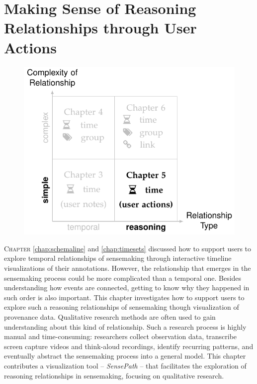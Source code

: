\chapter{Making Sense of Reasoning Relationships through User Actions}
\label{chap:sensepath}

\graphicspath{{Chapter5/figures/}}

\begin{figure}[!h]
	\centering
	\includegraphics{work}
\end{figure}

\vspace{.8in}


\pagebreak

\lettrine{C}{hapter} \ref{chap:schemaline} and \autoref{chap:timesets} discussed how to support users to explore temporal relationships of sensemaking through interactive timeline visualizations of their annotations. However, the relationship that emerges in the sensemaking process could be more complicated than a temporal one. Besides understanding how events are connected, getting to know why they happened in such order is also important. This chapter investigates how to support users to explore such a reasoning relationships of sensemaking though visualization of provenance data. Qualitative research methods are often used to gain understanding about this kind of relationship. Such a research process is highly manual and time-consuming: researchers collect observation data, transcribe screen capture videos and think-aloud recordings, identify recurring patterns, and eventually abstract the sensemaking process into a general model. This chapter contributes a visualization tool -- \emph{SensePath} -- that facilitates the exploration of reasoning relationships in sensemaking, focusing on qualitative research.

